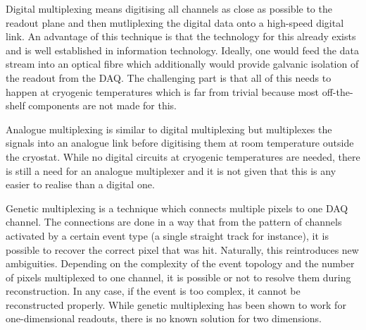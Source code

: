 Digital multiplexing means digitising all channels as close as possible to the readout plane and then mutliplexing the digital data onto a high-speed digital link.
An advantage of this technique is that the technology for this already exists and is well established in information technology.
Ideally, one would feed the data stream into an optical fibre which additionally would provide galvanic isolation of the readout from the DAQ.
The challenging part is that all of this needs to happen at cryogenic temperatures which is far from trivial because most off-the-shelf components are not made for this.

Analogue multiplexing is similar to digital multiplexing but multiplexes the signals into an analogue link before digitising them at room temperature outside the cryostat.
While no digital circuits at cryogenic temperatures are needed, there is still a need for an analogue multiplexer and it is not given that this is any easier to realise than a digital one.

Genetic multiplexing is a technique which connects multiple pixels to one DAQ channel.
The connections are done in a way that from the pattern of channels activated by a certain event type (a single straight track for instance), it is possible to recover the correct pixel that was hit.
Naturally, this reintroduces new ambiguities.
Depending on the complexity of the event topology and the number of pixels multiplexed to one channel, it is possible or not to resolve them during reconstruction.
In any case, if the event is too complex, it cannot be reconstructed properly.
While genetic multiplexing has been shown to work for one-dimensional readouts, there is no known solution for two dimensions. %

